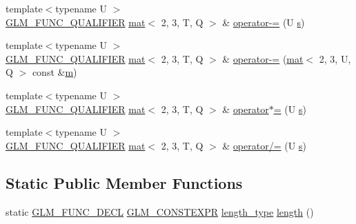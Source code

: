 \begin{DoxyCompactItemize}
{\footnotesize template$<$typename U $>$ }\\\hyperlink{setup_8hpp_a33fdea6f91c5f834105f7415e2a64407}{G\+L\+M\+\_\+\+F\+U\+N\+C\+\_\+\+Q\+U\+A\+L\+I\+F\+I\+ER} \hyperlink{structglm_1_1mat}{mat}$<$ 2, 3, T, Q $>$ \& \hyperlink{structglm_1_1mat_3_012_00_013_00_01_t_00_01_q_01_4_ad5e38086f1227daddc1ab3747efb750b}{operator-\/=} (U \hyperlink{_s_d_l__opengl_8h_a4af680a6c683f88ed67b76f207f2e6e4}{s})
\item 
{\footnotesize template$<$typename U $>$ }\\\hyperlink{setup_8hpp_a33fdea6f91c5f834105f7415e2a64407}{G\+L\+M\+\_\+\+F\+U\+N\+C\+\_\+\+Q\+U\+A\+L\+I\+F\+I\+ER} \hyperlink{structglm_1_1mat}{mat}$<$ 2, 3, T, Q $>$ \& \hyperlink{structglm_1_1mat_3_012_00_013_00_01_t_00_01_q_01_4_a3392fc843cab0b2ff28582955a12af76}{operator-\/=} (\hyperlink{structglm_1_1mat}{mat}$<$ 2, 3, U, Q $>$ const \&\hyperlink{_s_d_l__opengl__glext_8h_af593500c283bf1a787a6f947f503a5c2}{m})
\item 
{\footnotesize template$<$typename U $>$ }\\\hyperlink{setup_8hpp_a33fdea6f91c5f834105f7415e2a64407}{G\+L\+M\+\_\+\+F\+U\+N\+C\+\_\+\+Q\+U\+A\+L\+I\+F\+I\+ER} \hyperlink{structglm_1_1mat}{mat}$<$ 2, 3, T, Q $>$ \& \hyperlink{structglm_1_1mat_3_012_00_013_00_01_t_00_01_q_01_4_ac7f40e9c90e250e74982d6c83eb07604}{operator$\ast$=} (U \hyperlink{_s_d_l__opengl_8h_a4af680a6c683f88ed67b76f207f2e6e4}{s})
\item 
{\footnotesize template$<$typename U $>$ }\\\hyperlink{setup_8hpp_a33fdea6f91c5f834105f7415e2a64407}{G\+L\+M\+\_\+\+F\+U\+N\+C\+\_\+\+Q\+U\+A\+L\+I\+F\+I\+ER} \hyperlink{structglm_1_1mat}{mat}$<$ 2, 3, T, Q $>$ \& \hyperlink{structglm_1_1mat_3_012_00_013_00_01_t_00_01_q_01_4_a52c908488ef91afb7a1f68e9e3ddb606}{operator/=} (U \hyperlink{_s_d_l__opengl_8h_a4af680a6c683f88ed67b76f207f2e6e4}{s})
\end{DoxyCompactItemize}
\subsection*{Static Public Member Functions}
\begin{DoxyCompactItemize}
\item 
static \hyperlink{setup_8hpp_ab2d052de21a70539923e9bcbf6e83a51}{G\+L\+M\+\_\+\+F\+U\+N\+C\+\_\+\+D\+E\+CL} \hyperlink{setup_8hpp_a08b807947b47031d3a511f03f89645ad}{G\+L\+M\+\_\+\+C\+O\+N\+S\+T\+E\+X\+PR} \hyperlink{structglm_1_1mat_3_012_00_013_00_01_t_00_01_q_01_4_ad2e2433ba375abcd6bada873f8ea2de1}{length\+\_\+type} \hyperlink{structglm_1_1mat_3_012_00_013_00_01_t_00_01_q_01_4_a77bf3d190cef1bb5d40833ab5913c08f}{length} ()
\end{DoxyCompactItemize}
